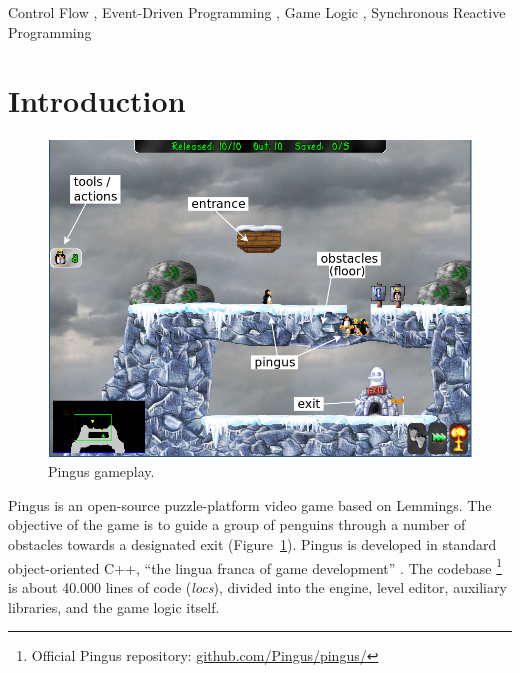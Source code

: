 \documentclass[times,twocolumn,final]{elsarticle}
\newcommand{\CEU}{\textsc{C\'{e}u}\xspace}
\newcommand{\locs}{\emph{locs}\xspace}
\begin{document}
\begin{frontmatter}
\begin{keyword}
Control Flow                \sep
Event-Driven Programming    \sep
Game Logic                  \sep
Synchronous Reactive Programming
\end{keyword}

\end{frontmatter}

\linenumbers

\section{Introduction}

\begin{figure}
\centering
\includegraphics[width=\columnwidth]{pingus-annotations}
\caption{Pingus gameplay.
\label{fig.pingus}
}
\end{figure}

Pingus is an open-source puzzle-platform video game based on Lemmings.
The objective of the game is to guide a group of penguins through a number of
obstacles towards a designated exit (Figure~\ref{fig.pingus}).
%
Pingus is developed in standard object-oriented C++, ``the lingua franca of
game development'' \cite{games.patterns}.
The codebase%
\footnote{Official Pingus repository: \url{github.com/Pingus/pingus/}}
is about 40.000 lines of code (\locs), divided into
the engine, level editor, auxiliary libraries, and the game logic itself.
\end{document}
